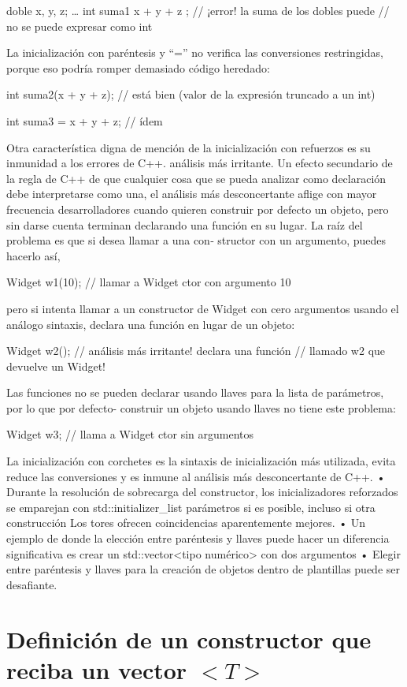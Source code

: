 \documentclass[10pt]{article}
\begin{document}
doble x, y, z;
…
int suma1{ x + y + z }; // ¡error! la suma de los dobles puede
// no se puede expresar como int

La inicialización con paréntesis y “=” no verifica las conversiones restringidas,
porque eso podría romper demasiado código heredado:

int suma2(x + y + z); // está bien (valor de la expresión truncado a un int)

int suma3 = x + y + z; // ídem

Otra característica digna de mención de la inicialización con refuerzos es su inmunidad a los errores de C++.
análisis más irritante. Un efecto secundario de la regla de C++ de que cualquier cosa que se pueda analizar como
declaración debe interpretarse como una, el análisis más desconcertante aflige con mayor frecuencia
desarrolladores cuando quieren construir por defecto un objeto, pero sin darse cuenta terminan
declarando una función en su lugar. La raíz del problema es que si desea llamar a una con‐
structor con un argumento, puedes hacerlo así,

Widget w1(10); // llamar a Widget ctor con argumento 10

pero si intenta llamar a un constructor de Widget con cero argumentos usando el análogo
sintaxis, declara una función en lugar de un objeto:

Widget w2(); // análisis más irritante! declara una función
// llamado w2 que devuelve un Widget!

Las funciones no se pueden declarar usando llaves para la lista de parámetros, por lo que por defecto-
construir un objeto usando llaves no tiene este problema:

Widget w3{}; // llama a Widget ctor sin argumentos


La inicialización con corchetes es la sintaxis de inicialización más utilizada, evita
reduce las conversiones y es inmune al análisis más desconcertante de C++.
• Durante la resolución de sobrecarga del constructor, los inicializadores reforzados se emparejan con
std::initializer\_list parámetros si es posible, incluso si otra construcción
Los tores ofrecen coincidencias aparentemente mejores.
• Un ejemplo de donde la elección entre paréntesis y llaves puede hacer un
diferencia significativa es crear un std::vector<tipo numérico> con dos
argumentos
• Elegir entre paréntesis y llaves para la creación de objetos dentro de plantillas
puede ser desafiante.

\vspace{2em}
\section{Definici\'on de  un constructor que reciba un vector $ <T> $}
\end{document}

